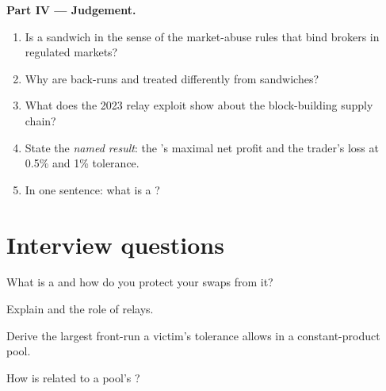 \begin{problem}
\medskip\noindent\textbf{Part IV --- Judgement.}
\begin{enumerate}[resume]
\item Is a sandwich  in the sense of the market-abuse rules that bind brokers in regulated markets?
\item Why are back-runs and  treated differently from sandwiches?
\item What does the 2023 relay exploit show about the block-building supply chain?
\item State the \emph{named result}: the 's maximal net profit and the trader's loss at 0.5\% and 1\% tolerance.
\item In one sentence: what is a ?
\end{enumerate}
\end{problem}

\section{Interview questions}

\begin{interviewq}\label{iq:m3:maximal-extractable-value:1}
What is a  and how do you protect your swaps from it?
\end{interviewq}

\begin{interviewq}\label{iq:m3:maximal-extractable-value:2}
Explain  and the role of relays.
\end{interviewq}

\begin{interviewq}\label{iq:m3:maximal-extractable-value:3}
Derive the largest front-run a victim's tolerance allows in a constant-product pool.
\end{interviewq}

\begin{interviewq}\label{iq:m3:maximal-extractable-value:4}
How is  related to a pool's ?
\end{interviewq}

